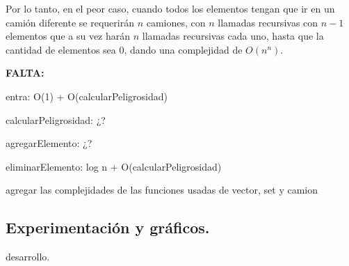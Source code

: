 Por lo tanto, en el peor caso, cuando todos los elementos tengan que ir en un 
camión diferente se requerirán $n$ camiones, con $n$ llamadas recursivas con 
$n - 1$ elementos que a su vez harán $n$ llamadas recursivas cada uno, hasta que
la cantidad de elementos sea 0, dando una complejidad de $O(n^n)$.

\textbf{FALTA:}

entra: O(1) + O(calcularPeligrosidad)

calcularPeligrosidad: ¿?

agregarElemento: ¿?

eliminarElemento: log n + O(calcularPeligrosidad)

agregar las complejidades de las funciones usadas de vector, set y camion

\vspace*{0.75cm} \noindent



\subsection{Experimentación y gráficos.}

\vspace*{0.3cm}

desarrollo.
